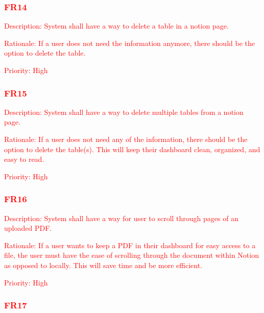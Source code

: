 \documentclass[12pt, titlepage]{article}
\begin{document}
\subsubsection{\textcolor{red}{FR14}}

\begin{description}
	\item \textcolor{red}{Description: System shall have a way to delete a table in a notion page.}
	\item \textcolor{red}{Rationale: If a user does not need the information anymore, there should be the option to delete the table.}
	\item \textcolor{red}{Priority: High}
\end{description}

\subsubsection{\textcolor{red}{FR15}}

\begin{description}
	\item \textcolor{red}{Description: System shall have a way to delete multiple tables from a notion page.}
	\item \textcolor{red}{Rationale: If a user does not need any of the information, there should be the option to delete the table(s). This will keep their dashboard clean, organized, and easy to read.}
	\item \textcolor{red}{Priority: High}
\end{description}

\subsubsection{\textcolor{red}{FR16}}

\begin{description}
	\item \textcolor{red}{Description: System shall have a way for user to scroll through pages of an uploaded PDF.}
	\item \textcolor{red}{Rationale: If a user wants to keep a PDF in their dashboard for easy access to a file, the user must have the ease of scrolling through the document within Notion as opposed to locally. This will save time and be more efficient.}
	\item \textcolor{red}{Priority: High}
\end{description}

\subsubsection{\textcolor{red}{FR17}}
\end{document}
